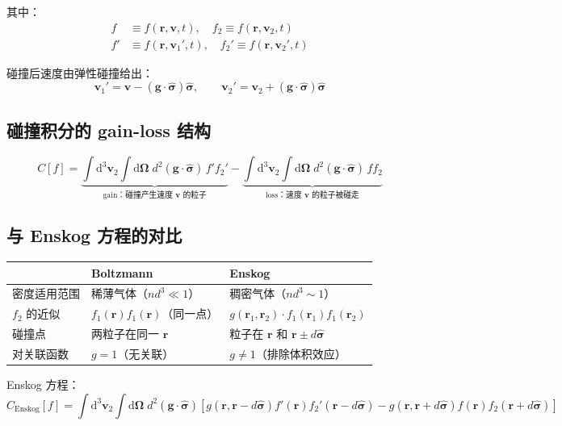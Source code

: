 \documentclass[11pt,a4paper]{article}
\newcommand{\ri}{\mathbf{r}}
\newcommand{\vi}{\mathbf{v}}
\newcommand{\Om}{\boldsymbol{\Omega}}
\begin{document}
其中：
\begin{align}
f &\equiv f(\ri,\vi,t), \quad f_2 \equiv f(\ri,\vi_2,t) \\
f' &\equiv f(\ri,\vi_1',t), \quad f_2' \equiv f(\ri,\vi_2',t)
\end{align}

碰撞后速度由弹性碰撞给出：
\begin{equation}
\vi_1' = \vi - (\mathbf{g}\cdot\hat{\boldsymbol{\sigma}})\hat{\boldsymbol{\sigma}}, \qquad \vi_2' = \vi_2 + (\mathbf{g}\cdot\hat{\boldsymbol{\sigma}})\hat{\boldsymbol{\sigma}}
\end{equation}

\subsection{碰撞积分的 gain-loss 结构}

\begin{equation}
C[f] = \underbrace{\int\mathrm{d}^3\vi_2\int\mathrm{d}\Om\; d^2(\mathbf{g}\cdot\hat{\boldsymbol{\sigma}})\,f'f_2'}_{\text{gain：碰撞产生速度 }\vi\text{ 的粒子}} - \underbrace{\int\mathrm{d}^3\vi_2\int\mathrm{d}\Om\; d^2(\mathbf{g}\cdot\hat{\boldsymbol{\sigma}})\,ff_2}_{\text{loss：速度 }\vi\text{ 的粒子被碰走}}
\end{equation}

\subsection{与 Enskog 方程的对比}

\begin{center}
\begin{tabular}{|l|l|l|}
\hline
& \textbf{Boltzmann} & \textbf{Enskog} \\
\hline
密度适用范围 & 稀薄气体（$nd^3 \ll 1$） & 稠密气体（$nd^3 \sim 1$） \\
\hline
$f_2$ 的近似 & $f_1(\ri)f_1(\ri)$（同一点） & $g(\ri_1,\ri_2)\cdot f_1(\ri_1)f_1(\ri_2)$ \\
\hline
碰撞点 & 两粒子在同一 $\ri$ & 粒子在 $\ri$ 和 $\ri\pm d\hat{\boldsymbol{\sigma}}$ \\
\hline
对关联函数 & $g=1$（无关联） & $g \neq 1$（排除体积效应） \\
\hline
\end{tabular}
\end{center}

Enskog 方程：
\begin{equation}
C_{\text{Enskog}}[f] = \int\mathrm{d}^3\vi_2\int\mathrm{d}\Om\; d^2(\mathbf{g}\cdot\hat{\boldsymbol{\sigma}})\left[g(\ri,\ri-d\hat{\boldsymbol{\sigma}})f'(\ri)f_2'(\ri-d\hat{\boldsymbol{\sigma}}) - g(\ri,\ri+d\hat{\boldsymbol{\sigma}})f(\ri)f_2(\ri+d\hat{\boldsymbol{\sigma}})\right]
\end{equation}
\end{document}
